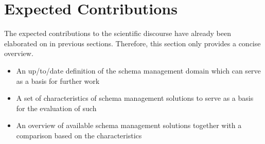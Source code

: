 
\section{Expected Contributions}\label{sec:expected-results}

The expected contributions to the scientific discourse have already been elaborated on in previous sections.
Therefore, this section only provides a concise overview.

\begin{itemize}
  \item An up\-/to\-/date definition of the schema management domain which can serve as a basis for further work
  \item A set of characteristics of schema management solutions to serve as a basis for the evaluation of such
  \item An overview of available schema management solutions together with a comparison based on the characteristics
\end{itemize}
